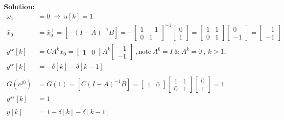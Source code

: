 \documentclass[twoside]{article}
\begin{document}
\textbf{Solution:} 
%
\begin{align*} 
	\omega_1 &= 0 \ \rightarrow \ u[k] = 1
	\\
 	\bar{x}_0 &= \bar{x}_0^+ = \left[ - (I - A)^{-1} B \right] = - \begin{bmatrix} 1 & -1 \\ 0 & 1 \end{bmatrix}^{-1} \begin{bmatrix} 0 \\ 1 \end{bmatrix} = 
	 \begin{bmatrix} 1 & 1 \\ 0 & 1 \end{bmatrix} \begin{bmatrix} 0 \\ -1 \end{bmatrix} = \begin{bmatrix} -1 \\ -1 \end{bmatrix} 
	 \\
	 y^{tr}[k] &= C A^k \bar{x}_0 = \begin{bmatrix} 1 & 0 \end{bmatrix} A^k \begin{bmatrix} -1 \\ -1 \end{bmatrix} \ ,  \mathrm{note} \  A^0 = I \ \& \ A^k = 0 \ , \ k > 1 ,
	 \\
	 y^{tr}[k] &= - \delta[k]  - \delta[k-1]
	 \\
	 \\
	 G(e^{j 0 }) &= G(1) = \left[ C (I - A)^{-1} B \right] = \begin{bmatrix} 1 & 0 \end{bmatrix} \begin{bmatrix} 1 & 1 \\ 0 & 1 \end{bmatrix} \begin{bmatrix} 0 \\ 1 \end{bmatrix} = 1
	 \\
	 y^{ss}[k] &= 1
	 \\
	 \\
	 y[k] &= 1 - \delta[k]  - \delta[k-1]
\end{align*}

\end{document}
